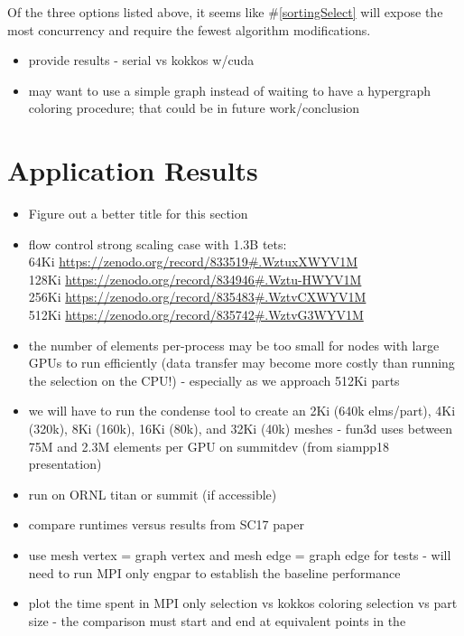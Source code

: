 \documentclass[graybox]{svmult}
\begin{document}
Of the three options listed above, it seems like \#\ref{sortingSelect} will
expose the most concurrency and require the fewest algorithm modifications.

\begin{itemize}
  \item provide results - serial vs kokkos w/cuda
  \item may want to use a simple graph instead of waiting to have a hypergraph coloring procedure; that could be in future work/conclusion
\end{itemize}

\section{Application Results} \label{sec:results}

\begin{itemize}
  \item Figure out a better title for this section
  \item flow control strong scaling case with 1.3B tets: \\
64Ki \url{https://zenodo.org/record/833519#.WztuxXWYV1M} \\
128Ki \url{https://zenodo.org/record/834946#.Wztu-HWYV1M} \\
256Ki \url{https://zenodo.org/record/835483#.WztvCXWYV1M} \\
512Ki \url{https://zenodo.org/record/835742#.WztvG3WYV1M}
  \item the number of elements per-process may be too small for nodes with large GPUs to run efficiently (data transfer may become more costly than running the selection on the CPU!) - especially as we approach 512Ki parts
  \item we will have to run the condense tool to create an 2Ki (640k elms/part),
    4Ki (320k), 8Ki (160k), 16Ki (80k), and 32Ki (40k) meshes -
    fun3d uses between 75M and 2.3M elements per GPU on summitdev (from siampp18
    presentation)
  \item run on ORNL titan or summit (if accessible)
  \item compare runtimes versus results from SC17 paper~\cite{engparSC17}
  \item use mesh vertex = graph vertex and mesh edge = graph edge for tests -
    will need to run MPI only engpar to establish the baseline performance
  \item plot the time spent in MPI only selection vs kokkos coloring selection
    vs part size - the comparison must start and end at equivalent points in the

\end{itemize}
\end{document}
